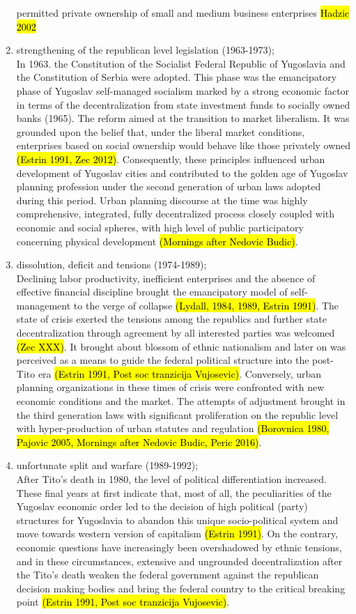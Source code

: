 \documentclass[11pt]{report}
\begin{document}
\begin{enumerate}
permitted private ownership of small and medium business enterprises \hl{Hadzic 2002}
\item  strengthening of the republican level legislation (1963-1973);
\\
In 1963. the Constitution of the Socialist Federal Republic of Yugoslavia  and the Constitution of Serbia were adopted. This phase was the emancipatory phase of Yugoslav self-managed socialism marked by a strong economic factor in terms of the decentralization from state investment  funds  to  socially  owned  banks (1965). The reform aimed at the transition to market liberalism. It was grounded upon the belief that, under the liberal market conditions, enterprises based on social ownership would behave like those privately owned \hl{(Estrin 1991, Zec 2012)}. Consequently, these principles influenced urban development of Yugoslav cities and contributed to the golden age of Yugoslav planning profession under the second generation of urban laws adopted during this period. Urban planning discourse at the time was highly comprehensive, integrated, fully decentralized process closely coupled with economic and social spheres, with high level of public participatory concerning physical development \hl{(Mornings after Nedovic Budic)}.
\item dissolution, deficit and tensions (1974-1989);
\\
Declining labor productivity, inefficient enterprises  and  the  absence  of  effective  financial  discipline brought the emancipatory model of self-management to the verge of collapse \hl{(Lydall,  1984, 1989, Estrin 1991)}. The state of crisis exerted the tensions among the republics and further state decentralization through  agreement  by  all  interested parties was welcomed \hl{(Zec XXX)}. It brought about blossom of ethnic nationalism and later on was perceived as a means to guide  the  federal  political  structure  into  the post-Tito era \hl{(Estrin 1991, Post soc tranzicija Vujosevic)}. Conversely, urban planning organizations in these times of crisis were confronted with new economic conditions and the market. The attempts of adjustment brought in the third generation laws with significant proliferation on the republic level with hyper-production of urban statutes and regulation \hl{(Borovnica 1980, Pajovic 2005, Mornings after Nedovic Budic, Peric 2016)}.
\item unfortunate split and warfare (1989-1992);
\\
After Tito's death in 1980, the level of political differentiation increased.
These final years at first indicate that, most of all, the peculiarities of the Yugoslav economic order led to the decision of high political (party) structures for Yugoslavia to abandon this unique socio-political system and  move towards western version of capitalism \hl{(Estrin 1991)}. On the contrary, economic  questions  have  increasingly  been  overshadowed by  ethnic  tensions, and in these circumstances, extensive and ungrounded decentralization after the Tito's death weaken the federal government against the republican decision making bodies and bring the federal country to the critical breaking point \hl{(Estrin 1991, Post soc tranzicija Vujosevic)}.
\end{enumerate}
\end{document}
